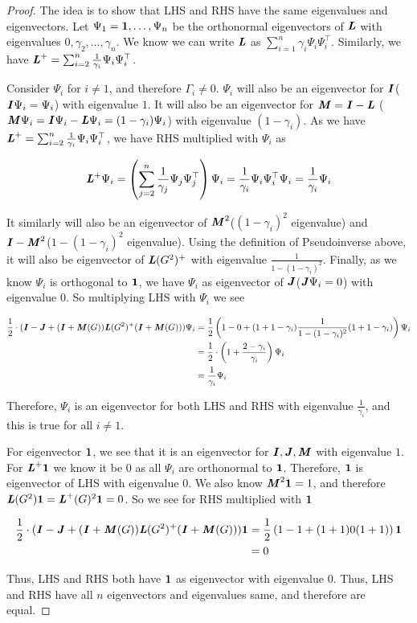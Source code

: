\documentclass{article}
\begin{document}
\begin{proof}
    The idea is to show that LHS and RHS have the same eigenvalues and eigenvectors. Let $\Psi_1=\V{1},\ldots,\Psi_n$ be the orthonormal eigenvectors of $\boldsymbol{\mathit{L}}$ with eigenvalues $0,\gamma_2,\ldots,\gamma_n$. We know we can write $\boldsymbol{\mathit{L}}$ as $\sum_{i=1}^n\gamma_i\Psi_i\Psi_i^\top$. Similarly, we have $\boldsymbol{\mathit{L}}^+=\sum_{i=2}^n\frac{1}{\gamma_i}\Psi_i\Psi_i^\top$.

    Consider $\Psi_i$ for $i\neq 1$, and therefore $\Gamma_i\neq 0$. $\Psi_i$ will also be an eigenvector for $\boldsymbol{\mathit{I}}$($\boldsymbol{\mathit{I}}\Psi_i=\Psi_i$) with eigenvalue $1$. It will also be an eigenvector for $\boldsymbol{\mathit{M}}=\boldsymbol{\mathit{I}}-\boldsymbol{\mathit{L}}$ ($\boldsymbol{\mathit{M}}\Psi_i=\boldsymbol{\mathit{I}}\Psi_i-\boldsymbol{\mathit{L}}\Psi_i=(1-\gamma_i)\Psi_i$) with eigenvalue $(1-\gamma_i)$. As we have $\boldsymbol{\mathit{L}}^+=\sum_{i=2}^n\frac{1}{\gamma_i}\Psi_i\Psi_i^\top$, we have RHS multiplied with $\Psi_i$ as
    
    $$\boldsymbol{\mathit{L}}^+\Psi_i=\left(\sum_{j=2}^n\frac{1}{\gamma_j}\Psi_j\Psi_j^\top\right)\Psi_i=\frac{1}{\gamma_i}\Psi_i\Psi_i^\top\Psi_i=\frac{1}{\gamma_i}\Psi_i$$
    
    It similarly will also be an eigenvector of $\boldsymbol{\mathit{M}}^2$($(1-\gamma_i)^2$ eigenvalue) and $\boldsymbol{\mathit{I}}-\boldsymbol{\mathit{M}}^2$($1-(1-\gamma_i)^2$ eigenvalue). Using the definition of Pseudoinverse above, it will also be eigenvector of $\boldsymbol{\mathit{L}}(G^2)^+$ with eigenvalue $\frac{1}{1-(1-\gamma_i)^2}$. Finally, as we know $\Psi_i$ is orthogonal to $\V{1}$, we have $\Psi_i$ as eigenvector of $\boldsymbol{\mathit{J}}$($\boldsymbol{\mathit{J}}\Psi_i=0$) with eigenvalue $0$. So multiplying LHS with $\Psi_i$ we see

    \begin{align*}
    \frac{1}{2}\cdot(\boldsymbol{\mathit{I}}-\boldsymbol{\mathit{J}}+(\boldsymbol{\mathit{I}}+\boldsymbol{\mathit{M}}(G))\boldsymbol{\mathit{L}}(G^2)^+(\boldsymbol{\mathit{I}}+\boldsymbol{\mathit{M}}(G)))\Psi_i&=\frac{1}{2}\left(1-0+(1+1-\gamma_i)\frac{1}{1-(1-\gamma_i)^2}(1+1-\gamma_i)\right)\Psi_i\\
    &=\frac{1}{2}\cdot\left(1+\frac{2-\gamma_i}{\gamma_i}\right)\Psi_i \\
    &=\frac{1}{\gamma_i}\Psi_i    
    \end{align*}

    Therefore, $\Psi_i$ is an eigenvector for both LHS and RHS with eigenvalue $\frac{1}{\gamma_i}$, and this is true for all $i\neq 1$. 

    For eigenvector $\V{1}$, we see that it is an eigenvector for $\boldsymbol{\mathit{I}},\boldsymbol{\mathit{J}},\boldsymbol{\mathit{M}}$ with eigenvalue $1$. For $\LL^{+}\V{1}$ we know it be $0$ as all $\Psi_i$ are orthonormal to $\V{1}$. Therefore, $\V{1}$ is eigenvector of LHS with eigenvalue $0$. We also know $\MM^2\V{1}=1$, and therefore $\LL(G^2)\V{1}=\LL^+(G)^2\V{1}=0$. So we see for RHS multiplied with $\V{1}$

    \begin{align*}
    \frac{1}{2}\cdot(\II-\JJ+(\II+\MM(G))\LL(G^2)^+(\II+\MM(G)))\V{1}&=\frac{1}{2}\left(1-1+(1+1)0(1+1)\right)\V{1}\\
    &=0  
    \end{align*}

    Thus, LHS and RHS both have $\V{1}$ as eigenvector with eigenvalue 0. Thus, LHS and RHS have all $n$ eigenvectors and eigenvalues same, and therefore are equal.
\end{proof}
\end{document}
